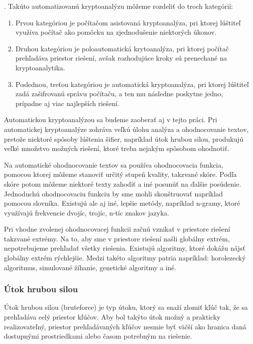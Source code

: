  \cite{ks}.
Takúto automatizovanú kryptoanalýzu môžeme rozdeliť do troch kategórií:
\begin{enumerate}
\item
Prvou kategóriou je počítačom asistovaná kryptoanalýza, pri ktorej lúštiteľ využíva
počítač ako pomôcku na zjednodušenie niektorých úkonov.
\item
Druhou kategóriou je poloautomatická krytoanalýza, pri ktorej počítač prehľadáva priestor riešení, avšak
rozhodujúce kroky sú prenechané na kryptoanalytika.
\item
Poslednou, treťou kategóriou je automatická kryptoanalýza, pri ktorej lúštiteľ zadá zašifrovanú správu počítaču, a ten mu následne poskytne jedno, prípadne aj viac najlepších riešení.
\end{enumerate}

Automatickou kryptoanalýzou sa budeme zaoberať aj v tejto práci.
Pri automatickej kryptoanalýze zohráva veľkú úlohu analýza a ohodnocovanie textov, pretože niektoré spôsoby lúštenia šifier,
napríklad útok hrubou silou, produkujú veľké množstvo možných riešení, ktoré treba nejakým spôsobom ohodnotiť.

Na automatické ohodnocovanie textov sa používa ohodnocovacia funkcia, pomocou ktorej môžeme stanoviť určitý stupeň kvality, takzvané skóre.
Podľa skóre potom môžeme niektoré texty zahodiť a iné posunúť na ďalšie posúdenie.
Jednoduchú ohodnocovaciu funkciu by sme mohli skonštruovať napríklad pomocou slovníka.
Existujú ale aj iné, lepšie metódy, napríklad n-gramy, ktoré využívajú frekvencie dvojíc, trojíc, n-tíc znakov jazyka.

Pri vhodne zvolenej ohodnocovacej funkcii začnú vznikať v priestore riešení takzvané extrémy. Na to, aby sme v priestore riešení našli globálny extrém, nepotrebujeme prehľadať všetky riešenia. Existujú algoritmy, ktoré dokážu nájsť globálny extrém rýchlejšie.
Medzi takéto algoritmy patria napríklad: horolezecký algoritmus, simulované žíhanie, genetické algoritmy a iné.

\subsubsection{Útok hrubou silou}
Útok hrubou silou (bruteforce) je typ útoku, ktorý sa snaží zlomiť kľúč tak, že sa prehľadáva celý priestor kľúčov.
Aby bol takýto útok možný a prakticky realizovateľný, priestor prehľadávaných kľúčov nesmie byť väčší ako hranica daná dostupnými
prostriedkami alebo časom potrebným na riešenie.

